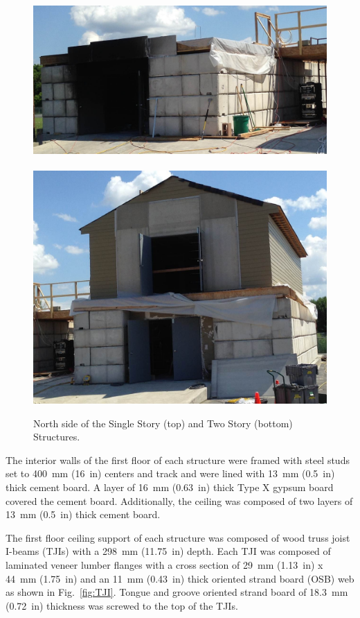 \documentclass[12pt,oneside]{book}
\begin{document}
\begin{figure}[!ht]
	\includegraphics[width=5.25in]{../Figures/Pictures/east_structure}
	\\~\\
	\includegraphics[width=5.25in]{../Figures/Pictures/west_structure}
	\caption[North side of the Single Story and Two Story Structures.]{North side of the Single Story (top) and Two Story (bottom) Structures.}
	\label{fig:struct_pics}
\end{figure}

The interior walls of the first floor of each structure were framed with steel studs set to 400~mm (16~in) centers and track and were lined with 13~mm (0.5~in) thick cement board. A layer of 16~mm (0.63~in) thick Type X gypsum board covered the cement board. Additionally, the ceiling was composed of two layers of 13~mm (0.5~in) thick cement board.
\FloatBarrier

The first floor ceiling support of each structure was composed of wood truss joist I-beams (TJIs) with a 298~mm (11.75~in) depth. Each TJI was composed of laminated veneer lumber flanges with a cross section of 29~mm (1.13~in) x 44~mm (1.75~in) and an 11~mm (0.43~in) thick oriented strand board (OSB) web as shown in Fig.~\ref{fig:TJI}. Tongue and groove oriented strand board of 18.3~mm (0.72~in) thickness was screwed to the top of the TJIs.
\end{document}
